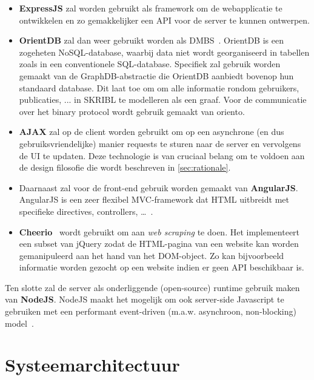 \documentclass{article}
\begin{document}
\begin{itemize}

\item \textbf{ExpressJS} zal worden gebruikt als framework om de webapplicatie te ontwikkelen en zo gemakkelijker een API voor de server te kunnen ontwerpen\cite{website:ExpressJS}. 

\item \textbf{OrientDB} zal dan weer gebruikt worden als DMBS~\cite{website:OrientDB}. OrientDB is een zogeheten NoSQL-database, waarbij data niet wordt georganiseerd in tabellen zoals in een conventionele SQL-database. Specifiek zal gebruik worden gemaakt van de GraphDB-abstractie die OrientDB aanbiedt bovenop hun standaard database. 
Dit laat toe om om alle informatie rondom gebruikers, publicaties, ... in SKRIBL te modelleren als een graaf. Voor de communicatie over het binary protocol wordt gebruik gemaakt van oriento.~\cite{website:Oriento}

\item \textbf{AJAX} zal op de client worden gebruikt om op een asynchrone (en dus gebruiksvriendelijke) manier requests te sturen naar de server en vervolgens de UI te updaten. Deze technologie is van cruciaal belang om te voldoen aan de design filosofie die wordt beschreven in \ref{sec:rationale}.

\item Daarnaast zal voor de front-end gebruik worden gemaakt van \textbf{AngularJS}. AngularJS  is een zeer flexibel MVC-framework dat HTML uitbreidt met specifieke directives, controllers, \dots~\cite{website:AngularJS}. 

\item \textbf{Cheerio}~\cite{website:cheerio} wordt gebruikt om aan \textit{web scraping} te doen. Het implementeert een subset van jQuery zodat de HTML-pagina van een website kan worden gemanipuleerd aan het hand van het DOM-object. Zo kan bijvoorbeeld informatie worden gezocht op een website indien er geen API beschikbaar is.


\end{itemize}


Ten slotte zal de server als onderliggende (open-source) runtime gebruik maken van \textbf{NodeJS}. NodeJS maakt het mogelijk om ook server-side Javascript te gebruiken met een performant event-driven (m.a.w. asynchroon, non-blocking) model~\cite{website:NodeJS}. 
\clearpage

\section{Systeemarchitectuur}
\end{document}
